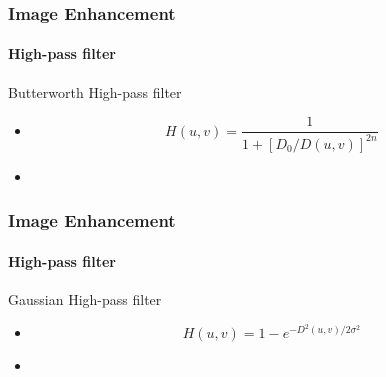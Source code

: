 \documentclass{beamer}
\begin{document}
\begin{frame}
\frametitle{Image Enhancement}
\framesubtitle{High-pass filter}
\begin{block}{Butterworth High-pass filter}
\scriptsize{
\begin{itemize}
\item[] 	$$ H(u,v) = \frac{1}{1+[D_{0}/D(u,v)]^{2n}}$$
\item[]
\end{itemize}
}
\end{block}
\end{frame}
\begin{frame}
\frametitle{Image Enhancement}
\framesubtitle{High-pass filter}
\begin{block}{Gaussian High-pass filter}

\begin{itemize}
	\item[] 	$$ H(u,v) = 1 - e^{-D^{2}(u,v)/2\sigma^{2}}$$ 
	\item[]
\end{itemize}
\end{block}
\end{frame}
\end{document}
